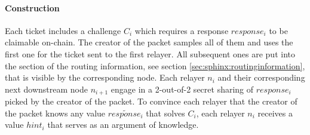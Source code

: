 \paragraph{Construction}

Each ticket includes a challenge $C_i$ which requires a response $response_i$ to be claimable on-chain. The creator of the packet samples all of them and uses the first one for the ticket sent to the first relayer. All subsequent ones are put into the section of the routing information, see section \ref{sec:sphinx:routinginformation}, that is visible by the corresponding node. Each relayer $n_i$ and their corresponding next downstream node $n_{i+1}$ engage in a 2-out-of-2 secret sharing of $response_i$ picked by the creator of the packet. To convince each relayer that the creator of the packet knows any value $\widetilde{response_i}$ that solves $C_i$, each relayer $n_i$ receives a value $hint_i$ that serves as an argument of knowledge.

